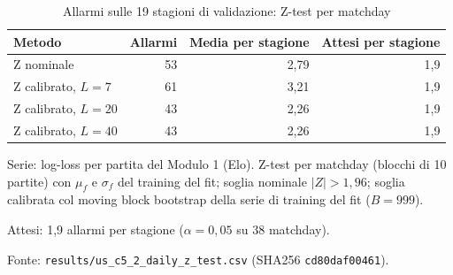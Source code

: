 \begin{table}[htbp]
\centering
\small
\caption{Allarmi sulle 19 stagioni di validazione: Z-test per matchday}
\label{tab:allarmi}
\begin{tabular}{lrrr}
\toprule
Metodo & Allarmi & Media per stagione & Attesi per stagione \\
\midrule
Z nominale & 53 & 2,79 & 1,9 \\
Z calibrato, $L = 7$ & 61 & 3,21 & 1,9 \\
Z calibrato, $L = 20$ & 43 & 2,26 & 1,9 \\
Z calibrato, $L = 40$ & 43 & 2,26 & 1,9 \\
\bottomrule
\end{tabular}

\smallskip
\begin{minipage}{\linewidth}
\footnotesize
Serie: log-loss per partita del Modulo 1 (Elo). Z-test per matchday (blocchi di 10 partite) con $\mu_f$ e $\sigma_f$ del training del fit; soglia nominale $|Z| > 1{,}96$; soglia calibrata col moving block bootstrap della serie di training del fit ($B = 999$).\par
Attesi: 1,9 allarmi per stagione ($\alpha = 0{,}05$ su 38 matchday).\par
Fonte: \texttt{results/us\_c5\_2\_daily\_z\_test.csv} (SHA256 \texttt{cd80daf00461}).
\end{minipage}
\end{table}
